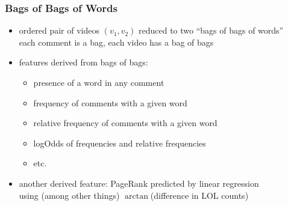 \documentclass[fleqn]{beamer}
\begin{document}
\begin{frame}
\frametitle{Bags of Bags of Words}
     \begin{itemize}
         \item ordered pair of videos $(v_1, v_2)$ reduced to two ``bags of bags of words''  \\
                  each comment is a bag, each video has a bag of bags

         \item features derived from bags of bags:
             \begin{itemize}
                 \item presence of a word in any comment
                 \item frequency of comments with a given word
                 \item relative frequency of comments with a given word
                 \item  logOdds of frequencies and relative frequencies
                 \item etc.
              \end{itemize}
         
         \item another derived feature: PageRank predicted by linear regression\\ 
                  using (among other things) $\arctan$(difference in LOL counts)
     
     \end{itemize}
\end{frame}
\end{document}
